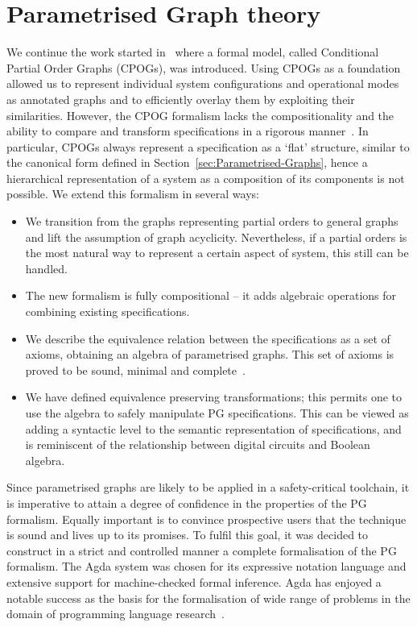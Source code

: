 \section{Parametrised Graph theory}

We continue the work started in~\cite{2010_mokhov_ieee}
where a formal model, called Conditional Partial Order Graphs (CPOGs),
was introduced. Using CPOGs as a foundation allowed us to represent individual system configurations
and operational modes as annotated graphs and to efficiently overlay them by exploiting
their similarities. However, the CPOG formalism lacks the compositionality
and the ability to compare and transform specifications in a rigorous
manner~\cite{pg_algebra}. In particular, CPOGs always represent a specification as
a `flat' structure, similar to the canonical form defined in Section~\ref{sec:Parametrised-Graphs},
hence a hierarchical representation of a system as a composition of
its components is not possible. We extend this formalism in several
ways:

\begin{itemize}
\item We transition from the graphs representing partial orders to general graphs and lift the assumption of graph acyclicity.
Nevertheless, if a partial orders is the most natural way to represent
a certain aspect of system, this still can be handled. 
\item The new formalism is fully compositional -- it adds algebraic operations for combining existing specifications.
\item We describe the equivalence relation between the specifications as
a set of axioms, obtaining an algebra of parametrised graphs. This set of axioms is proved
to be sound, minimal and complete~\cite{pg_algebra}.
\item We have defined equivalence preserving transformations; this permits one to use the algebra to safely manipulate PG specifications. 
This can be viewed as adding a syntactic level to the semantic representation
of specifications, and is reminiscent of the relationship between digital
circuits and Boolean algebra.
\end{itemize}

Since parametrised graphs are likely to be applied in a safety-critical toolchain, it is imperative to attain a degree of confidence in the properties of the PG formalism. Equally important is to convince prospective users that the technique is sound and lives up to its promises. To fulfil this goal, it was decided to construct in a strict and controlled manner a complete formalisation of the PG formalism. The Agda system \cite{norell:thesis} was chosen for its expressive notation language and extensive support for machine-checked formal inference. Agda has enjoyed a notable success as the basis for the formalisation of wide range of problems in the domain of programming language research~\cite{LTL-types-FRP,indexed-containers}.

